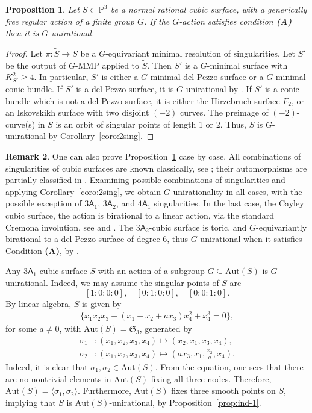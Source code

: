 \documentclass[12pt,reqno]{amsart}
\theoremstyle{plain}
\newtheorem{prop}{Proposition}[section]
\theoremstyle{remark}
\theoremstyle{definition}
\newtheorem{rema}[prop]{Remark}
\numberwithin{equation}{section}
\def\sA{{\mathsf A}}
\def\fS{{\mathfrak S}}
\def\fS{{\mathfrak S}}
\def\bP{{\mathbb P}}
\def\Aut{\mathrm{Aut}}
\begin{document}
\begin{prop}
\label{prop:surface-g}
Let $S\subset \bP^3$ be a normal rational cubic surface, with a generically free regular 
action of a finite group $G$. If the $G$-action satisfies condition {\bf (A)} then it is $G$-unirational.  
\end{prop}
\begin{proof}
    Let $\pi:\tilde S\to S$ be a $G$-equivariant minimal resolution of singularities. Let $S'$ be the output of $G$-MMP applied to $\tilde S$. Then $S'$ is a $G$-minimal surface with $K_{S'}^2\geq 4$. In particular, $S'$ is either a $G$-minimal del Pezzo surface or a $G$-minimal conic bundle. If $S'$ is a del Pezzo surface, it is $G$-unirational by \cite[Theorem 1.4]{Duncan}. If $S'$ is a conic bundle which is not a del Pezzo surface, it is either the Hirzebruch surface $F_2$, or an Iskovskikh surface with two disjoint $(-2)$ curves. The preimage of $(-2)$-curve(s) in $S$ is an orbit of singular points of length 1 or 2. Thus, $S$ is $G$-unirational by Corollary~\ref{coro:2sing}.
\end{proof}
\begin{rema}
One can also prove Proposition~\ref{prop:surface-g} case by case. All combinations of singularities of cubic surfaces are known classically, see \cite{Bruce-Wall}; their automorphisms are partially classified in \cite{sakamaki}.   Examining possible combinations of singularities \cite[Table 1]{sakamaki} and applying Corollary~\ref{coro:2sing}, we obtain $G$-unirationality in all cases, with the possible exception of $3\mathsf A_1$, $3\mathsf A_2$, and $4\mathsf A_1$ singularities. In the last case, the Cayley cubic surface, the action is birational to a linear action, via the standard Cremona involution, see \cite[Section 5]{CTZ-cubic} and \cite[Section 7]{CMTZ}. The $3\sA_2$-cubic surface is toric, and $G$-equivariantly birational to a del Pezzo surface of degree 6, thus $G$-unirational when it satisfies Condition {\bf (A)}, by \cite{Duncan}.  

Any $3\sA_1$-cubic surface $S$ with an action of a subgroup $G\subseteq \Aut(S)$ is $G$-unirational. 
Indeed, we may assume the singular points of $S$ are 
    $$
    [1:0:0:0],\quad [0:1:0:0],\quad[0:0:1:0].
    $$
    By linear algebra, $S$ is given by
\begin{align}
\label{eqn:3a1eq}
\{x_1x_2x_3+(x_1+x_2+ax_3)x_4^2+x_4^3=0\},
\end{align}
for some $a\ne 0$, with $\Aut(S)=\fS_3$, generated by 
\begin{align*}
\sigma_1&:(x_1,x_2,x_3,x_4)\mapsto(x_2,x_1,x_3,x_4),\\
\sigma_2&:(x_1,x_2,x_3,x_4)\mapsto(ax_3,x_1,\frac{x_2}{a},x_4).
\end{align*}
Indeed, it is clear that $\sigma_1,\sigma_2\in\Aut(S)$. 
From the equation, one sees that there are no nontrivial elements in $\Aut(S)$ fixing all three nodes. Therefore, $\Aut(S)=\langle\sigma_1,\sigma_2\rangle$.
Furthermore, $\Aut(S)$ fixes three smooth points on $S$, implying that $S$ is $\Aut(S)$-unirational, by Proposition~\ref{prop:ind-1}.
 \end{rema}
\end{document}
